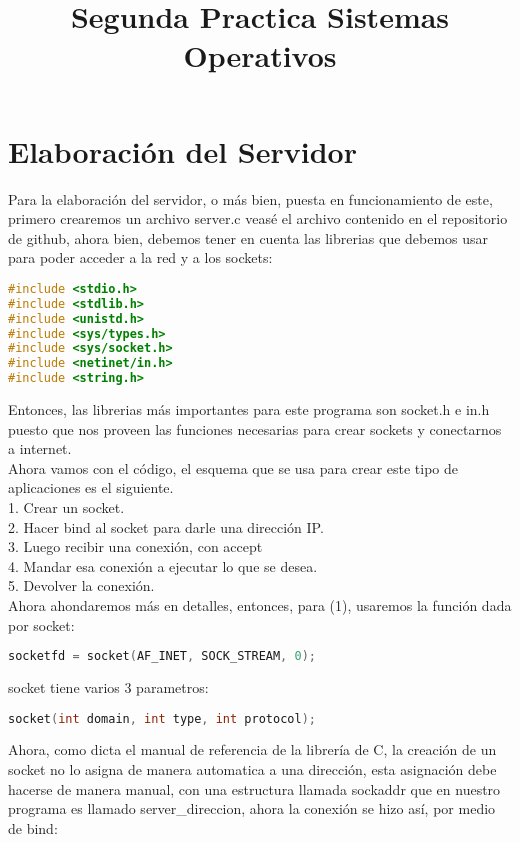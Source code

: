 \documentclass{article}
\title{Segunda Practica Sistemas Operativos}
\begin{document}
\maketitle



\section{Elaboración del Servidor}
Para la elaboración del servidor, o más bien, puesta en funcionamiento de este, primero crearemos un archivo server.c
veasé el archivo contenido en el repositorio de github, ahora bien, debemos tener en cuenta las librerias que debemos usar para poder acceder a la red y a los sockets:
\begin{lstlisting}[language=C]
#include <stdio.h>
#include <stdlib.h>
#include <unistd.h>
#include <sys/types.h>
#include <sys/socket.h>
#include <netinet/in.h>
#include <string.h>
\end{lstlisting}
Entonces, las librerias más importantes para este programa son socket.h e in.h puesto que nos proveen las funciones necesarias para crear sockets y conectarnos a internet.\\
Ahora vamos con el código, el esquema que se usa para crear este tipo de aplicaciones es el siguiente.\\ 
1. Crear un socket.\\
2. Hacer bind al socket para darle una dirección IP.\\
3. Luego recibir una conexión, con accept\\ 
4. Mandar esa conexión a ejecutar lo que se desea.\\ 
5. Devolver la conexión.\\
Ahora ahondaremos más en detalles, entonces, para (1), usaremos la función dada por socket: 
\begin{lstlisting}[language=C]
socketfd = socket(AF_INET, SOCK_STREAM, 0);
\end{lstlisting}

socket\cite{man7socket} tiene varios 3 parametros:

\begin{lstlisting}[language=C]
socket(int domain, int type, int protocol);
\end{lstlisting}

Ahora, como dicta el manual de referencia de la librería de C\cite{manual}, la creación de un socket no lo asigna de manera automatica a una dirección, esta asignación debe hacerse de manera manual, con una estructura llamada sockaddr que en nuestro programa es llamado server\_direccion, ahora la conexión se hizo así, por medio de bind\cite{man7bind}:
\end{document}
